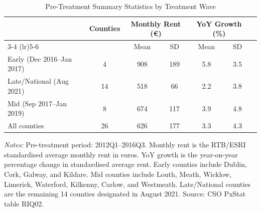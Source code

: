 \begin{table}[t]
\centering
\caption{Pre-Treatment Summary Statistics by Treatment Wave}
\label{tab:summary}
\begin{tabular}{lcccccc}
\toprule
 & Counties & \multicolumn{2}{c}{Monthly Rent (\euro)} & \multicolumn{2}{c}{YoY Growth (\%)} \\
\cmidrule(lr){3-4} \cmidrule(lr){5-6}
 & & Mean & SD & Mean & SD \\
\midrule
Early (Dec 2016--Jan 2017) & 4 & 908 & 189 & 5.8 & 3.5 \\
Late/National (Aug 2021) & 14 & 518 & 66 & 2.2 & 3.8 \\
Mid (Sep 2017--Jan 2019) & 8 & 674 & 117 & 3.9 & 4.8 \\
\midrule
All counties & 26 & 626 & 177 & 3.3 & 4.3 \\
\bottomrule
\end{tabular}
\par\vspace{0.3em}\begin{minipage}{\textwidth}\footnotesize
\textit{Notes:} Pre-treatment period: 2012Q1--2016Q3. Monthly rent is the RTB/ESRI standardised average monthly rent in euros. YoY growth is the year-on-year percentage change in standardised average rent. Early counties include Dublin, Cork, Galway, and Kildare. Mid counties include Louth, Meath, Wicklow, Limerick, Waterford, Kilkenny, Carlow, and Westmeath. Late/National counties are the remaining 14 counties designated in August 2021. Source: CSO PxStat table RIQ02.
\end{minipage}
\end{table}

